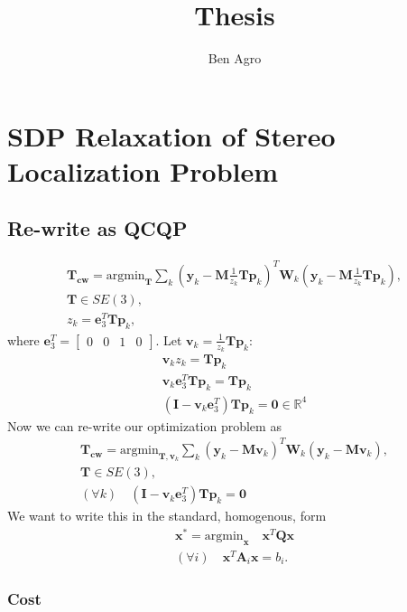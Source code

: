 \documentclass{article}
\title{Thesis}
\author{Ben Agro}
\date{}
\newcommand{\mbf}[1]{\mathbf{#1}}
\newcommand{\bbm}{\begin{bmatrix}}
\newcommand{\ebm}{\end{bmatrix}}
\begin{document}
\maketitle

\section{SDP Relaxation of Stereo Localization Problem}

\subsection{Re-write as QCQP}

\begin{align}
\mbf{T_{cw}} = \text{argmin}_{\mbf{T}} \sum_k (\mbf{y}_k - \mbf{M} \frac{1}{z_k} \mbf{T} \mbf{p}_k)^T \mbf{W}_k (\mbf{y}_k - \mbf{M} \frac{1}{z_k} \mbf{T} \mbf{p}_k),\\
\mbf{T} \in SE(3),\\
z_k = \mbf{e}_3^T \mbf{T} \mbf{p}_k,
\end{align}
where $\mbf{e}_3^T = \bbm0 & 0 & 1 & 0\ebm.$
Let $\mbf{v}_k = \frac{1}{z_k}\mbf{T}\mbf{p}_k$:
\begin{align}
\mbf{v}_kz_k = \mbf{T}\mbf{p}_k\\
\mbf{v}_k \mbf{e}_3^T \mbf{T} \mbf{p}_k = \mbf{T}\mbf{p}_k\\
(\mbf{I} - \mbf{v}_k \mbf{e}_3^T)\mbf{T}\mbf{p}_k = \mbf{0} \in \mathbb R^4
\end{align}
Now we can re-write our optimization problem as
\begin{align}
\mbf{T_{cw}} = \text{argmin}_{\mbf{T}, \mbf{v}_k} \sum_k (\mbf{y}_k - \mbf{M} \mbf{v}_k)^T \mbf{W}_k (\mbf{y}_k - \mbf{M} \mbf{v}_k),\\
\mbf{T} \in SE(3),\\
(\forall k) \quad (\mbf{I} - \mbf{v}_k \mbf{e}_3^T)\mbf{T}\mbf{p}_k = \mbf{0}
\end{align}
We want to write this in the standard, homogenous, form 
\begin{align}
\mbf{x}^* = \text{argmin}_{\mbf{x}} \quad \mbf{x}^T \mbf{Q} \mbf{x}\\
(\forall i) \quad \mbf{x}^T \mbf{A}_i \mbf{x} = b_i.
\end{align}

\subsubsection{Cost}
\end{document}
